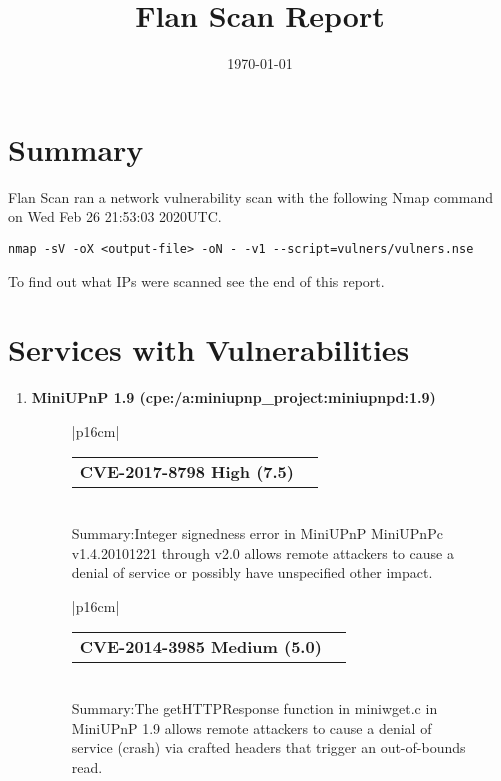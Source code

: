 \documentclass{article}
\title{Flan Scan Report\\}
\date{\today}
\begin{document}
\maketitle

\section*{Summary}
Flan Scan ran a network vulnerability scan with the following Nmap command on Wed Feb 26 21:53:03 2020UTC.
\begin{lstlisting}
nmap -sV -oX <output-file> -oN - -v1 --script=vulners/vulners.nse
\end{lstlisting}
To find out what IPs were scanned see the end of this report.
\section*{Services with Vulnerabilities}\begin{enumerate}[wide, labelwidth=!, labelindent=0pt,
                        label=\textbf{\large \arabic{enumi} \large}]
\item \textbf{\large MiniUPnP 1.9 (cpe:/a:miniupnp\_project:miniupnpd:1.9)  \large}\begin{figure}[h!]
\begin{tabular}{|p{16cm}|} \begin{tabular}{@{}p{15cm}>{\raggedleft\arraybackslash}
                           p{0.5cm}@{}}\textbf{CVE-2017-8798 High (7.5)} & \href{https://nvd.nist.gov/vuln/detail/CVE-2017-8798}{\large \faicon{link}}\end{tabular}\\
 Summary:Integer signedness error in MiniUPnP MiniUPnPc v1.4.20101221 through v2.0 allows remote attackers to cause a denial of service or possibly have unspecified other impact.\\ \hline \end{tabular}  \end{figure}
\begin{figure}[h!]
\begin{tabular}{|p{16cm}|} \begin{tabular}{@{}p{15cm}>{\raggedleft\arraybackslash}
                           p{0.5cm}@{}}\textbf{CVE-2014-3985 Medium (5.0)} & \href{https://nvd.nist.gov/vuln/detail/CVE-2014-3985}{\large \faicon{link}}\end{tabular}\\
 Summary:The getHTTPResponse function in miniwget.c in MiniUPnP 1.9 allows remote attackers to cause a denial of service (crash) via crafted headers that trigger an out-of-bounds read.\\ \hline \end{tabular}  \end{figure}

\end{enumerate}
\end{document}
